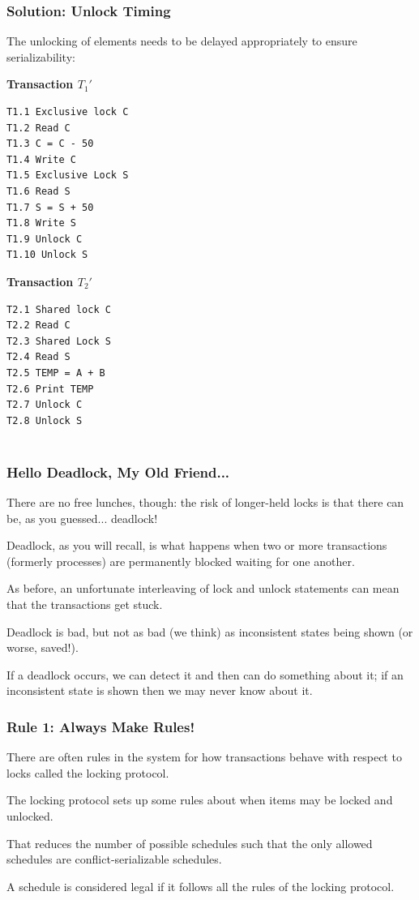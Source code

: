 \begin{frame}[fragile]
\frametitle{Solution: Unlock Timing}

The unlocking of elements needs to be delayed appropriately to ensure serializability: 

\begin{multicols}{2}
\textbf{Transaction $T_{1}'$}
\begin{verbatim}
T1.1 Exclusive lock C
T1.2 Read C
T1.3 C = C - 50
T1.4 Write C
T1.5 Exclusive Lock S
T1.6 Read S
T1.7 S = S + 50
T1.8 Write S
T1.9 Unlock C
T1.10 Unlock S
\end{verbatim}

\columnbreak
\textbf{Transaction $T_{2}'$}
\begin{verbatim}
T2.1 Shared lock C
T2.2 Read C
T2.3 Shared Lock S
T2.4 Read S
T2.5 TEMP = A + B
T2.6 Print TEMP
T2.7 Unlock C
T2.8 Unlock S


\end{verbatim}
\end{multicols}


\end{frame}

\begin{frame}
\frametitle{Hello Deadlock, My Old Friend...}

There are no free lunches, though: the risk of longer-held locks is that there can be, as you guessed... \alert{deadlock}! 

Deadlock, as you will recall, is what happens when two or more transactions (formerly processes) are permanently blocked waiting for one another. 

As before, an unfortunate interleaving of lock and unlock statements can mean that the transactions get stuck. 

Deadlock is bad, but not as bad (we think) as inconsistent states being shown (or worse, saved!). 

If a deadlock occurs, we can detect it and then can do something about it; if an inconsistent state is shown then we may never know about it.


\end{frame}

\begin{frame}
\frametitle{Rule 1: Always Make Rules!}

There are often rules in the system for how transactions behave with respect to locks called the \alert{locking protocol}. 

The locking protocol sets up some rules about when items may be locked and unlocked.

That reduces the number of possible schedules such that the only allowed schedules are conflict-serializable schedules. 

A schedule is considered legal if it follows all the rules of the locking protocol.

\end{frame}

